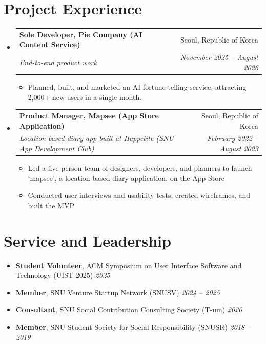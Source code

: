 \documentclass[letterpaper,10pt]{article}
\makeatletter
\newcommand{\ENTRYSEP}{0.4em}\newcommand{\PLAINSEP}{0.3em}
\newcommand{\DETSEP}{0.14em}\newcommand{\TOPSEP}{0.35em}
\newcommand{\ENTRYDROP}{-0.15em}
\newcommand{\ENTRYSEP}{0.18em}\newcommand{\PLAINSEP}{0.15em}
\newcommand{\DETSEP}{0.06em}\newcommand{\TOPSEP}{0.18em}
\newcommand{\ENTRYDROP}{-0.35em}
\let\oldsection\section
\renewcommand{\section}[1]{\needspace{8\baselineskip}\oldsection{#1}}
\newcommand{\entry}[4]{%
  \needspace{3.2\baselineskip}\item
  \begin{tabularx}{\linewidth}[t]{@{}>{\raggedright\arraybackslash}X@{\hspace{1.2em}}r@{}}
    \textbf{#1} & #2 \\[0.05em]
    \textit{\small #3} & \textit{\small #4} \\
  \end{tabularx}\vspace{\ENTRYDROP}%
}
\newenvironment{entries}
  {\begin{itemize}[leftmargin=1.2em, itemsep=\ENTRYSEP, parsep=0pt, topsep=\TOPSEP]}
  {\end{itemize}}
\newenvironment{details}
  {\begin{itemize}[label=$\circ$, leftmargin=1.4em, itemsep=\DETSEP, parsep=0pt, topsep=\TOPSEP]}
  {\end{itemize}\vspace{-0.2em}}
\newenvironment{plain}
  {\begin{itemize}[leftmargin=1.2em, itemsep=\PLAINSEP, parsep=0pt, topsep=\TOPSEP]}
  {\end{itemize}}
\makeatother
\begin{document}
\section{Project Experience}
\begin{entries}
  \entry{Sole Developer, Pie Company (AI Content Service)}{Seoul, Republic of Korea}
        {End-to-end product work}{November 2025 -- August 2026}
  \begin{details}
    \item Planned, built, and marketed an AI fortune-telling service, attracting 2,000+ new
          users in a single month.
  \end{details}

  \entry{Product Manager, Mapsee (App Store Application)}{Seoul, Republic of Korea}
        {Location-based diary app built at Happetite (SNU App Development Club)}{February 2022 -- August 2023}
  \begin{details}
    \item Led a five-person team of designers, developers, and planners to launch `mapsee',
          a location-based diary application, on the App Store
    \item Conducted user interviews and usability tests, created wireframes, and built the MVP
  \end{details}
\end{entries}

\section{Service and Leadership}
\begin{plain}
  \item \textbf{Student Volunteer}, ACM Symposium on User Interface Software and Technology
        (UIST 2025) \hfill \textit{\small 2025}
  \item \textbf{Member}, SNU Venture Startup Network (SNUSV) \hfill \textit{\small 2024 -- 2025}
  \item \textbf{Consultant}, SNU Social Contribution Consulting Society (T-um) \hfill \textit{\small 2020}
  \item \textbf{Member}, SNU Student Society for Social Responsibility (SNUSR) \hfill \textit{\small 2018 -- 2019}
\end{plain}

\end{document}
